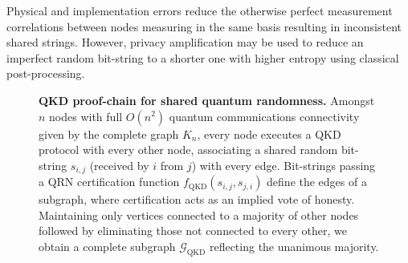 \documentclass[twocolumn, aps, amsmath, amssymb, nofootinbib, superscriptaddress, longbibliography, floatfix, eqsecnum, rmp]{revtex4-2}
\begin{document}
Physical and implementation errors reduce the otherwise perfect measurement correlations between nodes measuring in the same basis resulting in inconsistent shared strings. However, privacy amplification \cite{PrivacyAmp} may be used to reduce an imperfect random bit-string to a shorter one with higher entropy using classical post-processing.

%



\begin{figure}[!htb]
	
%	
	\caption{\textbf{QKD proof-chain for shared quantum randomness.} Amongst $n$ nodes with full $O(n^2)$ quantum communications connectivity given by the complete graph $K_n$, every node executes a QKD protocol with every other node, associating a shared random bit-string $s_{i,j}$ (received by $i$ from $j$) with every edge. Bit-strings passing a QRN certification function $f_\mathrm{QKD}(s_{i,j},s_{j,i})$ define the edges of a subgraph, where certification acts as an implied vote of honesty. Maintaining only vertices connected to a majority of other nodes followed by eliminating those not connected to every other, we obtain a complete subgraph $\mathcal{G}_\mathrm{QKD}$ reflecting the unanimous majority.} \label{fig:proof_chains_QKD}
\end{figure}
\end{document}
